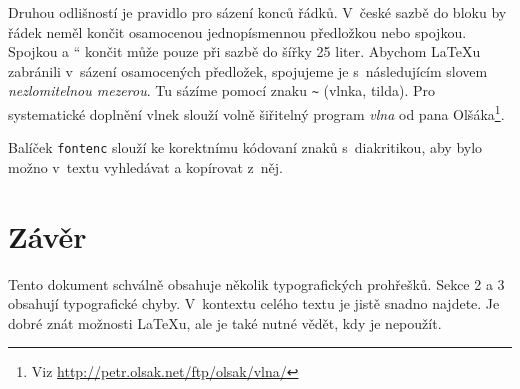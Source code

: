 \documentclass[a4paper, 10pt, twocolumn, final]{article}
\providecommand{\uv}[1]{\quotedblbase #1 \textquotedblleft}
\begin{document}
Druhou odlišností je pravidlo pro sázení konců řádků.
V~české sazbě do bloku by řádek neměl končit osamocenou jednopísmennou předložkou nebo spojkou.
Spojkou \uv{a} končit může pouze při sazbě do šířky 25 liter.
Abychom \LaTeX{}u zabránili v~sázení osamocených předložek, spojujeme je s~následujícím slovem \emph{nezlomitelnou mezerou}.
Tu sázíme pomocí znaku \verb|~| (vlnka, tilda).
Pro systematické doplnění vlnek slouží volně šiřitelný program \emph{vlna} od pana Olšáka\footnote{Viz \url{http://petr.olsak.net/ftp/olsak/vlna/}}.

Balíček \texttt{fontenc} slouží ke korektnímu kódovaní znaků s~diakritikou, aby bylo možno v~textu vyhledávat a kopírovat z~něj.


\section{Závěr}

Tento dokument schválně obsahuje několik typografických prohřešků.
Sekce 2 a 3 obsahují typografické chyby.
V~kontextu celého textu je jistě snadno najdete.
Je dobré znát možnosti \LaTeX{}u, ale je také nutné vědět, kdy je nepoužít.
\end{document}
